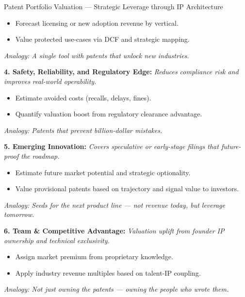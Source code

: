 \begin{TechnicalSidebar}{Patent Portfolio Valuation --- Strategic Leverage through IP Architecture}
    \medskip
    \begin{itemize}
      \item Forecast licensing or new adoption revenue by vertical.
      \item Value protected use-cases via DCF and strategic mapping.
    \end{itemize}

    \medskip

    \textit{Analogy: A single tool with patents that unlock new industries.}
    
    \medskip
    
    \textbf{4. Safety, Reliability, and Regulatory Edge:}  
    \textit{Reduces compliance risk and improves real-world operability.}

    \medskip
    \begin{itemize}
      \item Estimate avoided costs (recalls, delays, fines).
      \item Quantify valuation boost from regulatory clearance advantage.
    \end{itemize}

    \medskip

    \textit{Analogy: Patents that prevent billion-dollar mistakes.}
    
    \medskip
    
    \textbf{5. Emerging Innovation:}  
    \textit{Covers speculative or early-stage filings that future-proof the roadmap.}

    \medskip
    \begin{itemize}
      \item Estimate future market potential and strategic optionality.
      \item Value provisional patents based on trajectory and signal value to investors.
    \end{itemize}

    \medskip

    \textit{Analogy: Seeds for the next product line — not revenue today, but leverage tomorrow.}
    
    \medskip
    
    \textbf{6. Team \& Competitive Advantage:}  
    \textit{Valuation uplift from founder IP ownership and technical exclusivity.}

    \medskip
    \begin{itemize}
      \item Assign market premium from proprietary knowledge.
      \item Apply industry revenue multiples based on talent-IP coupling.
    \end{itemize}
    \textit{Analogy: Not just owning the patents — owning the people who wrote them.}


\end{TechnicalSidebar}
